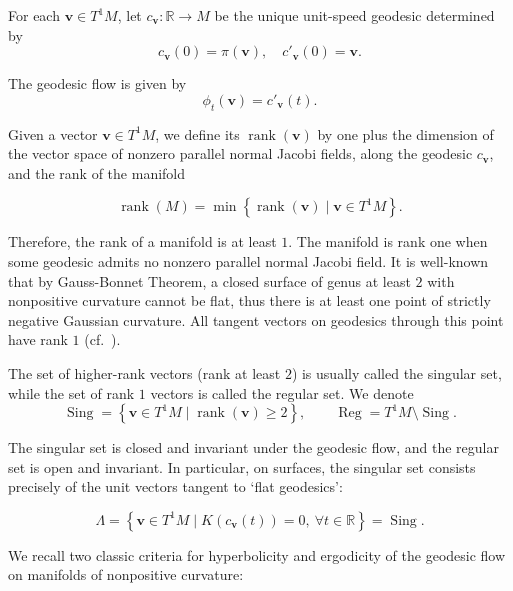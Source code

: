 \documentclass[reqno,11pt]{article}
\theoremstyle{definition}
\theoremstyle{remark}
\numberwithin{equation}{section}
\DeclareMathOperator{\rank}{rank}
\DeclareMathOperator{\sing}{Sing}
\DeclareMathOperator{\reg}{Reg}
\begin{document}
For each $\bm{v}\in T^{1}M$, let $c_{\bm{v}}:\mathbb{R}\to M$ be the unique unit-speed geodesic determined by
\begin{displaymath}
	c_{\bm{v}}(0)=\pi(\bm{v}),\quad c'_{\bm{v}}(0)=\bm{v}.
\end{displaymath}

The geodesic flow is given by
\begin{displaymath}
	\phi_t(\bm{v})=c'_{\bm{v}}(t).
\end{displaymath}

Given a vector $\bm{v}\in T^{1}M$, we define its $\rank(\bm{v})$ by one plus the dimension of the vector space of nonzero parallel normal Jacobi fields, along the geodesic $c_{\bm{v}}$, and the rank of the manifold

\begin{displaymath}
	\rank(M)=\min\left\{\rank(\bm{v})\mid \bm{v}\in T^{1}M\right\}.
\end{displaymath}

Therefore, the rank of a manifold is at least $1$. The manifold is rank one when some geodesic admits no nonzero parallel normal Jacobi field. It is well-known that by Gauss-Bonnet Theorem, a closed surface of genus at least $2$ with nonpositive curvature cannot be flat, thus there is at least one point of strictly negative Gaussian curvature. All tangent vectors on geodesics through this point have rank $1$ (cf.~\cite{Ballmann1985}).

The set of higher-rank vectors (rank at least $2$) is usually called the singular set, while the set of rank $1$ vectors is called the regular set. We denote
\begin{displaymath}
	\sing =\left\{\bm{v}\in T^{1}M \mid \rank(\bm{v})\ge 2\right\},\qquad \reg = T^{1}M\setminus \sing.
\end{displaymath}

The singular set is closed and invariant under the geodesic flow, and the regular set is open and invariant. In particular, on surfaces, the singular set consists precisely of the unit vectors tangent to `flat geodesics':

\begin{displaymath}
	\Lambda =\left\{\bm{v}\in T^{1}M \mid K(c_{\bm{v}}(t))=0,~\forall t\in\mathbb{R}\right\}=\sing.
\end{displaymath}

We recall two classic criteria for hyperbolicity and ergodicity of the geodesic flow on manifolds of nonpositive curvature:
\end{document}
